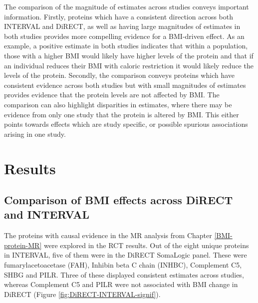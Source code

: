 \documentclass[11pt,twoside]{bristolthesis}
\begin{document}
The comparison of the magnitude of estimates across studies conveys important information. Firstly, proteins which have a consistent direction across both INTERVAL and DiRECT, as well as having large magnitudes of estimates in both studies provides more compelling evidence for a BMI-driven effect. As an example, a positive estimate in both studies indicates that within a population, those with a higher BMI would likely have higher levels of the protein and that if an individual reduces their BMI with caloric restriction it would likely reduce the levels of the protein. Secondly, the comparison conveys proteins which have consistent evidence across both studies but with small magnitudes of estimates provides evidence that the protein levels are not affected by BMI. The comparison can also highlight disparities in estimates, where there may be evidence from only one study that the protein is altered by BMI. This either points towards effects which are study specific, or possible spurious associations arising in one study.

\hypertarget{results-5}{%
\section{Results}\label{results-5}}

\hypertarget{comparison-of-bmi-effects-across-direct-and-interval}{%
\subsection{Comparison of BMI effects across DiRECT and INTERVAL}\label{comparison-of-bmi-effects-across-direct-and-interval}}

The proteins with causal evidence in the MR analysis from Chapter \ref{BMI-protein-MR} were explored in the RCT results. Out of the eight unique proteins in INTERVAL, five of them were in the DiRECT SomaLogic panel. These were fumarylacetoacetase (FAH), Inhibin beta C chain (INHBC), Complement C5, SHBG and PILR. Three of these displayed consistent estimates across studies, whereas Complement C5 and PILR were not associated with BMI change in DiRECT (Figure \ref{fig:DiRECT-INTERVAL-signif}).
\end{document}
